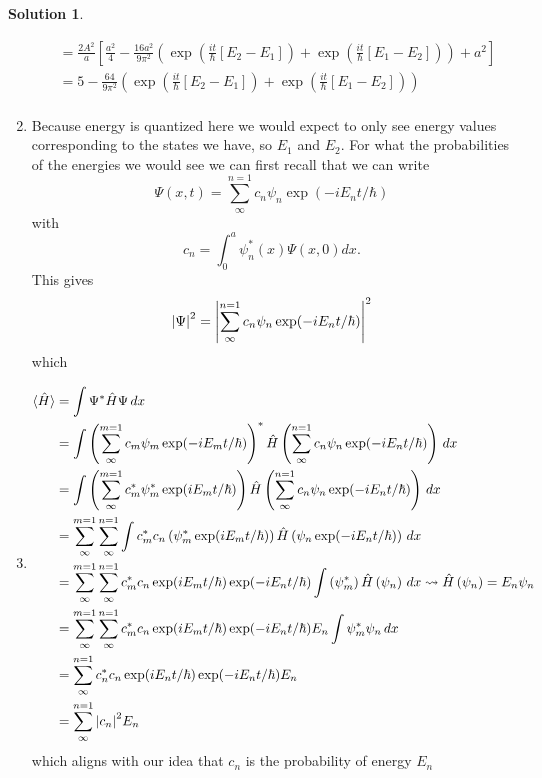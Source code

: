 \documentclass[10pt]{article}
\theoremstyle{definition}
\newtheorem{soln}{Solution}
\begin{document}
\begin{soln}
\begin{enumerate}[label=(\alph*)]
\begin{align*}
      &=\frac{2A^2}{a}\left[\frac{a^2}{4}
      -\frac{16a^2}{9\pi^2}\left(\exp(\frac{it}{\hbar}\left[E_2-E_1\right])
      +\exp(\frac{it}{\hbar}\left[E_1-E_2\right])\right)
      +a^2\right]\\
      &=5-\frac{64}{9\pi^2}\left(\exp(\frac{it}{\hbar}\left[E_2-E_1\right])
      +\exp(\frac{it}{\hbar}\left[E_1-E_2\right])\right)\\
    \end{align*}
    \item Because energy is quantized here we would expect to only see energy values corresponding to the states we have, so $E_1$ and $E_2$.
    For what the probabilities of the energies we would see we can first recall that we can write 
    $$\Psi(x,t)=\sum_{\infty}^{n=1}c_n\psi_n\exp(-iE_nt/\hbar)$$
    with 
    $$c_n=\int_{0}^{a}\psi_n^*(x)\Psi(x,0)dx.$$
    This gives 
    $$\abs{\Psi}^2=\abs{\sum_{\infty}^{n=1}c_n\psi_n\exp(-iE_nt/\hbar)}^2$$
    which 
    \item \begin{align*}
      \langle \hat{H} \rangle & = \int \Psi^*\hat{H}\Psi\,dx\\
      & = \int \left(\sum_{\infty}^{m=1}c_m\psi_m\exp(-iE_mt/\hbar)\right)^*\hat{H}\left(\sum_{\infty}^{n=1}c_n\psi_n\exp(-iE_nt/\hbar)\right)\,dx\\
      & = \int \left(\sum_{\infty}^{m=1}c_m^*\psi_m^*\exp(iE_mt/\hbar)\right)\hat{H}\left(\sum_{\infty}^{n=1}c_n\psi_n\exp(-iE_nt/\hbar)\right)\,dx\\
      & = \sum_{\infty}^{m=1}\sum_{\infty}^{n=1}\int c_m^*c_n\left(\psi_m^*\exp(iE_mt/\hbar)\right)\hat{H}\left(\psi_n\exp(-iE_nt/\hbar)\right)\,dx\\
      & = \sum_{\infty}^{m=1}\sum_{\infty}^{n=1}c_m^*c_n\exp(iE_mt/\hbar)\exp(-iE_nt/\hbar)\int \left(\psi_m^*\right)\hat{H}\left(\psi_n\right)\,dx\rightsquigarrow \hat{H}\left(\psi_n\right)=E_n\psi_n\\
      & = \sum_{\infty}^{m=1}\sum_{\infty}^{n=1}c_m^*c_n\exp(iE_mt/\hbar)\exp(-iE_nt/\hbar)E_n\int \psi_m^*\psi_n\,dx\\
      & = \sum_{\infty}^{n=1}c_n^*c_n\exp(iE_nt/\hbar)\exp(-iE_nt/\hbar)E_n\\
      & = \sum_{\infty}^{n=1}\abs{c_n}^2E_n\\
    \end{align*}
    which aligns with our idea that $c_n$ is the probability of energy $E_n$
  \end{enumerate}
\end{soln}
\end{document}
